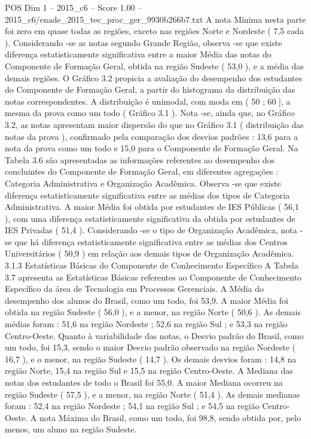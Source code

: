 \begin{textsample}{POS Dim 1 – 2015\_c6 – Score 1.00 – 2015\_c6/enade\_2015\_tec\_proc\_ger\_9930b266b7.txt}
A nota Mínima nesta parte foi zero em quase todas as regiões, exceto nas regiões Norte e Nordeste ( 7,5 cada ).
Considerando -se as notas segundo Grande Região, observa -se que existe diferença estatisticamente significativa entre a maior Média das notas do Componente de Formação Geral, obtida na região Sudeste ( 53,0 ), e a média das demais regiões.
O Gráfico 3.2 propicia a avaliação do desempenho dos estudantes do Componente de Formação Geral, a partir do histograma da distribuição das notas correspondentes.
A distribuição é unimodal, com moda em ( 50 ; 60 ], a mesma da prova como um todo ( Gráfico 3.1 ).
Nota -se, ainda que, no Gráfico 3.2, as notas apresentam maior dispersão do que no Gráfico 3.1 ( distribuição das notas da prova ), confirmado pela comparação dos desvios padrões : 13,6 para a nota da prova como um todo e 15,0 para o Componente de Formação Geral.
Na Tabela 3.6 são apresentadas as informações referentes ao desempenho dos concluintes do Componente de Formação Geral, em diferentes agregações : Categoria Administrativa e Organização Acadêmica.
Observa -se que existe diferença estatisticamente significativa entre as médias dos tipos de Categoria Administrativa.
A maior Média foi obtida por estudantes de IES Públicas ( 56,1 ), com uma diferença estatisticamente significativa da obtida por estudantes de IES Privadas ( 51,4 ).
Considerando -se o tipo de Organização Acadêmica, nota -se que há diferença estatisticamente significativa entre as médias dos Centros Universitários ( 50,9 ) em relação aos demais tipos de Organização Acadêmica. 3.1.3 Estatísticas Básicas do Componente de Conhecimento Específico A Tabela 3.7 apresenta as Estatísticas Básicas referentes ao Componente de Conhecimento Específico da área de Tecnologia em Processos Gerenciais.
A Média do desempenho dos alunos do Brasil, como um todo, foi 53,9.
A maior Média foi obtida na região Sudeste ( 56,0 ), e a menor, na região Norte ( 50,6 ).
As demais médias foram : 51,6 na região Nordeste ; 52,6 na região Sul ; e 53,3 na região Centro-Oeste.
Quanto à variabilidade das notas, o Desvio padrão do Brasil, como um todo, foi 15,3, sendo o maior Desvio padrão observado na região Nordeste ( 16,7 ), e o menor, na região Sudeste ( 14,7 ).
Os demais desvios foram : 14,8 na região Norte, 15,4 na região Sul e 15,5 na região Centro-Oeste.
A Mediana das notas dos estudantes de todo o Brasil foi 55,0.
A maior Mediana ocorreu na região Sudeste ( 57,5 ), e a menor, na região Norte ( 51,4 ).
As demais medianas foram : 52,4 na região Nordeste ; 54,1 na região Sul ; e 54,5 na região Centro-Oeste.
A nota Máxima do Brasil, como um todo, foi 98,8, sendo obtida por, pelo menos, um aluno na região Sudeste.

\end{textsample}
